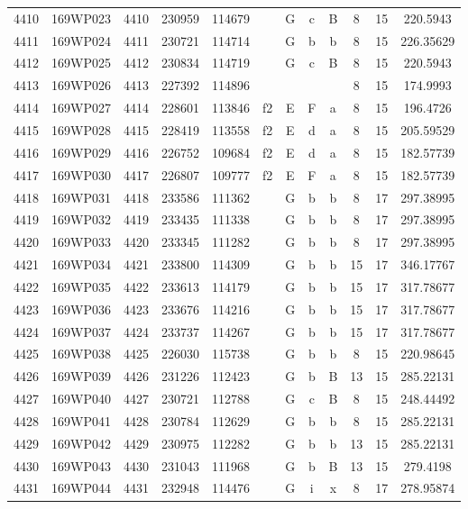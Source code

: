 \begin{tabular}{|*{12}{c|}}
4410 & 169WP023 & 4410 & 230959 & 114679 &  & G & c & B & 8 & 15 & 220.5943 \\ 
4411 & 169WP024 & 4411 & 230721 & 114714 &  & G & b & b & 8 & 15 & 226.35629 \\ 
4412 & 169WP025 & 4412 & 230834 & 114719 &  & G & c & B & 8 & 15 & 220.5943 \\ 
4413 & 169WP026 & 4413 & 227392 & 114896 &  &  &  &  & 8 & 15 & 174.9993 \\ 
4414 & 169WP027 & 4414 & 228601 & 113846 & f2 & E & F & a & 8 & 15 & 196.4726 \\ 
4415 & 169WP028 & 4415 & 228419 & 113558 & f2 & E & d & a & 8 & 15 & 205.59529 \\ 
4416 & 169WP029 & 4416 & 226752 & 109684 & f2 & E & d & a & 8 & 15 & 182.57739 \\ 
4417 & 169WP030 & 4417 & 226807 & 109777 & f2 & E & F & a & 8 & 15 & 182.57739 \\ 
4418 & 169WP031 & 4418 & 233586 & 111362 &  & G & b & b & 8 & 17 & 297.38995 \\ 
4419 & 169WP032 & 4419 & 233435 & 111338 &  & G & b & b & 8 & 17 & 297.38995 \\ 
4420 & 169WP033 & 4420 & 233345 & 111282 &  & G & b & b & 8 & 17 & 297.38995 \\ 
4421 & 169WP034 & 4421 & 233800 & 114309 &  & G & b & b & 15 & 17 & 346.17767 \\ 
4422 & 169WP035 & 4422 & 233613 & 114179 &  & G & b & b & 15 & 17 & 317.78677 \\ 
4423 & 169WP036 & 4423 & 233676 & 114216 &  & G & b & b & 15 & 17 & 317.78677 \\ 
4424 & 169WP037 & 4424 & 233737 & 114267 &  & G & b & b & 15 & 17 & 317.78677 \\ 
4425 & 169WP038 & 4425 & 226030 & 115738 &  & G & b & b & 8 & 15 & 220.98645 \\ 
4426 & 169WP039 & 4426 & 231226 & 112423 &  & G & b & B & 13 & 15 & 285.22131 \\ 
4427 & 169WP040 & 4427 & 230721 & 112788 &  & G & c & B & 8 & 15 & 248.44492 \\ 
4428 & 169WP041 & 4428 & 230784 & 112629 &  & G & b & b & 8 & 15 & 285.22131 \\ 
4429 & 169WP042 & 4429 & 230975 & 112282 &  & G & b & b & 13 & 15 & 285.22131 \\ 
4430 & 169WP043 & 4430 & 231043 & 111968 &  & G & b & B & 13 & 15 & 279.4198 \\ 
4431 & 169WP044 & 4431 & 232948 & 114476 &  & G & i & x & 8 & 17 & 278.95874 \\ 

\end{tabular}
